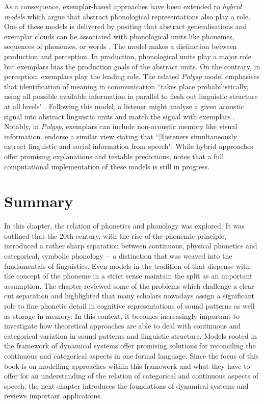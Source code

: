 As a consequence, exemplar-based approaches have been extended to \emph{hybrid models} which argue that abstract phonological representations also play a role. One of these models is delivered by \cite{Pierrehumbert2002} positing that abstract generalisations and exemplar clouds can be associated with phonological units like phonemes, sequences of phonemes, or words \citep[see also][]{GermanCarlsonPierrehumbert2013}. The model makes a distinction between production and perception. In production, phonological units play a major role but exemplars bias the production goals of the abstract units. On the contrary, in perception, exemplars play the leading role. The related \emph{Polysp} model \citep{HawkinsSmith2001, Hawkins2003} emphasises that identification of meaning in communication ``takes place probabilistically, using all possible available information in parallel to flesh out linguistic structure at all levels" \citep[391]{Hawkins2003}. Following this model, a listener might analyse a given acoustic signal into abstract linguistic units and match the signal with exemplars \citep{Ernestus2011}. Notably, in \emph{Polysp}, exemplars can include non-acoustic memory like visual information. \citet[8]{Sumneretal2014} endorse a similar view stating that ``[l]isteners simultaneously extract linguistic and social information from speech". While hybrid approaches offer promising explanations and testable predictions, \cite{Ernestus2011} notes that a full computational implementation of these models is still in progress.

\section{Summary}
In this chapter, the relation of phonetics and phonology was explored. It was outlined that the 20th century, with the rise of the phonemic principle, introduced a rather sharp separation between continuous, physical phonetics and categorical, symbolic phonology -- a distinction that was weaved into the fundamentals of linguistics. Even models in the tradition of \citet{ChomskyHalle1968} that dispense with the concept of the phoneme in a strict sense maintain the split as an important assumption. The chapter reviewed some of the problems which challenge a clear-cut separation and highlighted that many scholars nowadays assign a significant role to fine phonetic detail in cognitive representations of sound patterns as well as storage in memory. In this context, it becomes increasingly important to investigate how theoretical approaches are able to deal with continuous and categorical variation in sound patterns and linguistic structure. Models rooted in the framework of dynamical systems offer promising solutions for reconciling the continuous and categorical aspects in one formal language. Since the focus of this book is on modelling approaches within this framework and what they have to offer for an understanding of the relation of categorical and continuous aspects of speech, the next chapter introduces the foundations of dynamical systems and reviews important applications.

